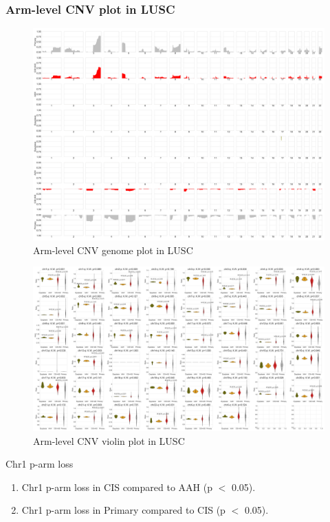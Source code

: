 \documentclass{beamer}
\begin{document}
            \begin{frame}[allowframebreaks]
                \frametitle{Arm-level CNV plot in LUSC}

                \begin{figure}
                    \includegraphics[width=0.7 \linewidth]{figures/Sequenza/BWA-simple-SQC.pdf}
                    \caption{Arm-level CNV genome plot in LUSC}
                \end{figure}

                \begin{figure}
                    \includegraphics[width=0.7 \linewidth]{figures/Sequenza/BWA-violin-SQC.pdf}
                    \caption{Arm-level CNV violin plot in LUSC}
                \end{figure}

                \begin{block}{Chr1 p-arm loss}
                    \begin{enumerate}
                        \item Chr1 p-arm loss in CIS compared to AAH (p $<$ 0.05).
                        \item Chr1 p-arm loss in Primary compared to CIS (p $<$ 0.05).
                    \end{enumerate}

                    \begin{table}
                        \caption{CGC Tier1 genes in Chr1 p-arm}
                        \resizebox{\linewidth}{!}
                        {}
                    \end{table}
                \end{block}


\end{frame}
\end{document}
